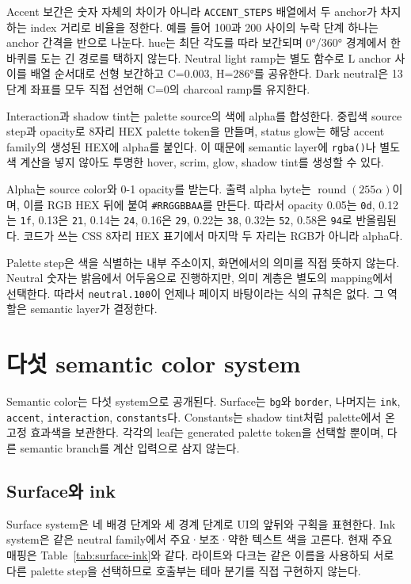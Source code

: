 \documentclass[11pt,titlepage]{article}
\begin{document}
Accent 보간은 숫자 자체의 차이가 아니라 \texttt{ACCENT\_STEPS} 배열에서 두 anchor가 차지하는 index 거리로 비율을 정한다. 예를 들어 100과 200 사이의 누락 단계 하나는 anchor 간격을 반으로 나눈다. hue는 최단 각도를 따라 보간되며 0°/360° 경계에서 한 바퀴를 도는 긴 경로를 택하지 않는다. Neutral light ramp는 별도 함수로 L anchor 사이를 배열 순서대로 선형 보간하고 C=0.003, H=286°를 공유한다. Dark neutral은 13단계 좌표를 모두 직접 선언해 C=0의 charcoal ramp를 유지한다.

Interaction과 shadow tint는 palette source의 색에 alpha를 합성한다. 중립색 source step과 opacity로 8자리 HEX palette token을 만들며, status glow는 해당 accent family의 생성된 HEX에 alpha를 붙인다. 이 때문에 semantic layer에 \texttt{rgba()}나 별도 색 계산을 넣지 않아도 투명한 hover, scrim, glow, shadow tint를 생성할 수 있다\cite{palette,ladder}.

Alpha는 source color와 0-1 opacity를 받는다. 출력 alpha byte는 \(\operatorname{round}(255\alpha)\)이며, 이를 RGB HEX 뒤에 붙여 \texttt{\#RRGGBBAA}를 만든다. 따라서 opacity 0.05는 \texttt{0d}, 0.12는 \texttt{1f}, 0.13은 \texttt{21}, 0.14는 \texttt{24}, 0.16은 \texttt{29}, 0.22는 \texttt{38}, 0.32는 \texttt{52}, 0.58은 \texttt{94}로 반올림된다. 코드가 쓰는 CSS 8자리 HEX 표기에서 마지막 두 자리는 RGB가 아니라 alpha다.

Palette step은 색을 식별하는 내부 주소이지, 화면에서의 의미를 직접 뜻하지 않는다. Neutral 숫자는 밝음에서 어두움으로 진행하지만, 의미 계층은 별도의 mapping에서 선택한다. 따라서 \texttt{neutral.100}이 언제나 페이지 바탕이라는 식의 규칙은 없다. 그 역할은 semantic layer가 결정한다.

\section{다섯 semantic color system}

Semantic color는 다섯 system으로 공개된다. Surface는 \texttt{bg}와 \texttt{border}, 나머지는 \texttt{ink}, \texttt{accent}, \texttt{interaction}, \texttt{constants}다. Constants는 shadow tint처럼 palette에서 온 고정 효과색을 보관한다. 각각의 leaf는 generated palette token을 선택할 뿐이며, 다른 semantic branch를 계산 입력으로 삼지 않는다\cite{semantics}.

\subsection{Surface와 ink}

Surface system은 네 배경 단계와 세 경계 단계로 UI의 앞뒤와 구획을 표현한다. Ink system은 같은 neutral family에서 주요·보조·약한 텍스트 색을 고른다. 현재 주요 매핑은 Table~\ref{tab:surface-ink}와 같다. 라이트와 다크는 같은 이름을 사용하되 서로 다른 palette step을 선택하므로 호출부는 테마 분기를 직접 구현하지 않는다\cite{semantics}.
\end{document}
